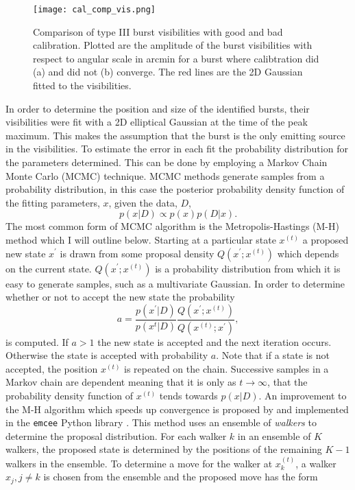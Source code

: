 \begin{figure}
\centering
\texttt{[image: cal\_comp\_vis.png]}
\caption[Comparison of type III burst visibilities with good and bad calibration.]{Comparison of type III burst visibilities with good and bad calibration. Plotted are the amplitude of the burst visibilities with respect to angular scale in arcmin for a burst where calibtration did (a) and did not (b) converge. The red lines are the 2D Gaussian fitted to the visibilities.}
\label{fig:cal_comp}
\end{figure}

In order to determine the position and size of the identified bursts, their visibilities were fit with a 2D elliptical Gaussian at the time of the peak maximum. This makes the assumption that the burst is the only emitting source in the visibilities.
To estimate the error in each fit the probability distribution for the parameters determined. This can be done by employing a Markov Chain Monte Carlo (MCMC) technique. MCMC methods generate samples from a probability distribution, in this case the posterior probability density function of the fitting parameters, $x$, given the data, $D$,
\begin{equation}
\label{eq:pdf}
p(x \vert D) \propto p(x)p(D \vert x).
\end{equation}	
The most common form of MCMC algorithm is the Metropolis-Hastings (M-H) method which I will outline below. Starting at a particular state $x^{(t)}$ a proposed new state $x^\prime$ is drawn from some proposal density $Q(x^\prime;x^{(t)})$ which depends on the current state. $Q(x^\prime;x^{(t)})$ is a probability distribution from which it is easy to generate samples, such as a multivariate Gaussian. In order to determine whether or not to accept the new state the probability
\begin{equation}
\label{eq:MHnewstate}
a = \frac{p(x^\prime \vert D)}{p(x^{t} \vert D)} \frac{Q(x^\prime;x^{(t)})}{Q(x^{(t)};x^\prime)},
\end{equation}
is computed. If $a > 1$ the new state is accepted and the next iteration occurs. Otherwise the state is accepted with probability $a$. Note that if a state is not accepted, the position $x^{(t)}$ is repeated on the chain. Successive samples in a Markov chain are dependent meaning that it is only as $t \rightarrow \infty$, that the probability density function of $x^{(t)}$ tends towards $p(x \vert D)$. An improvement to the M-H algorithm which speeds up convergence is proposed by \cite{Goodman2010} and implemented in the \texttt{emcee} Python library \citep{Foreman-Mackey2012}. This method uses an ensemble of \textit{walkers} to determine the proposal distribution. For each walker $k$ in an ensemble of $K$ walkers, the proposed state is determined by the positions of the remaining $K-1$ walkers in the ensemble. To determine a move for the walker at $x_k^{(t)}$, a walker $x_j, j \neq k$ is chosen from the ensemble and the proposed move has the form
